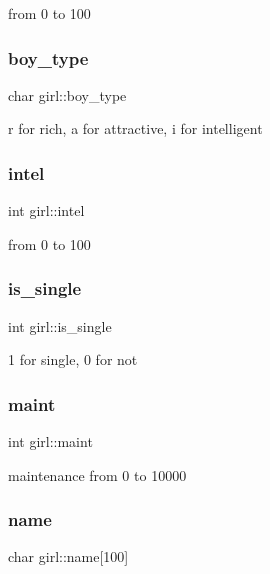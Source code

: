 from 0 to 100 \mbox{\label{classgirl_a4a3142c6754aeeb39d990b9dc0669376}} 
\subsubsection{\texorpdfstring{boy\+\_\+type}{boy\_type}}
{\footnotesize\ttfamily char girl\+::boy\+\_\+type}

\textquotesingle{}r\textquotesingle{} for rich, \textquotesingle{}a\textquotesingle{} for attractive, \textquotesingle{}i\textquotesingle{} for intelligent \mbox{\label{classgirl_a909600ba1a2bd73d658c59421e6634f8}} 
\subsubsection{\texorpdfstring{intel}{intel}}
{\footnotesize\ttfamily int girl\+::intel}

from 0 to 100 \mbox{\label{classgirl_a1e490c984ffcfef201b8e80c192d47d3}} 
\subsubsection{\texorpdfstring{is\+\_\+single}{is\_single}}
{\footnotesize\ttfamily int girl\+::is\+\_\+single}

1 for single, 0 for not \mbox{\label{classgirl_a27b54c74740855be0570b951ec43ec91}} 
\subsubsection{\texorpdfstring{maint}{maint}}
{\footnotesize\ttfamily int girl\+::maint}

maintenance from 0 to 10000 \mbox{\label{classgirl_afa8c09d42cab3f3508ccf4d7a0091959}} 
\subsubsection{\texorpdfstring{name}{name}}
{\footnotesize\ttfamily char girl\+::name\mbox{[}100\mbox{]}}

